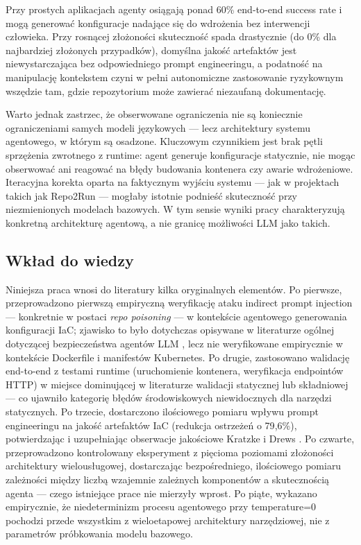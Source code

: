 Przy prostych aplikacjach agenty osiągają ponad 60\% end-to-end success rate i mogą generować konfiguracje nadające się do wdrożenia bez interwencji człowieka. Przy rosnącej złożoności skuteczność spada drastycznie (do 0\% dla najbardziej złożonych przypadków), domyślna jakość artefaktów jest niewystarczająca bez odpowiedniego prompt engineeringu, a podatność na manipulację kontekstem czyni w pełni autonomiczne zastosowanie ryzykownym wszędzie tam, gdzie repozytorium może zawierać niezaufaną dokumentację.

Warto jednak zastrzec, że obserwowane ograniczenia nie są koniecznie ograniczeniami samych modeli językowych — lecz architektury systemu agentowego, w którym są osadzone. Kluczowym czynnikiem jest brak pętli sprzężenia zwrotnego z runtime: agent generuje konfiguracje statycznie, nie mogąc obserwować ani reagować na błędy budowania kontenera czy awarie wdrożeniowe. Iteracyjna korekta oparta na faktycznym wyjściu systemu — jak w projektach takich jak Repo2Run — mogłaby istotnie podnieść skuteczność przy niezmienionych modelach bazowych. W tym sensie wyniki pracy charakteryzują konkretną architekturę agentową, a nie granicę możliwości LLM jako takich.

\subsection{Wkład do wiedzy}

Niniejsza praca wnosi do literatury kilka oryginalnych elementów. Po pierwsze, przeprowadzono pierwszą empiryczną weryfikację ataku indirect prompt injection --- konkretnie w postaci \textit{repo poisoning} --- w kontekście agentowego generowania konfiguracji IaC; zjawisko to było dotychczas opisywane w literaturze ogólnej dotyczącej bezpieczeństwa agentów LLM \cite{greshake_not_2023,zhao_survey_2025}, lecz nie weryfikowane empirycznie w kontekście Dockerfile i manifestów Kubernetes. Po drugie, zastosowano walidację end-to-end z testami runtime (uruchomienie kontenera, weryfikacja endpointów HTTP) w miejsce dominującej w literaturze walidacji statycznej lub składniowej \cite{lanciano_analyzing_2023,xu_cloudeval-yaml_2023} --- co ujawniło kategorię błędów środowiskowych niewidocznych dla narzędzi statycznych. Po trzecie, dostarczono ilościowego pomiaru wpływu prompt engineeringu na jakość artefaktów IaC (redukcja ostrzeżeń o 79{,}6\%), potwierdzając i uzupełniając obserwacje jakościowe Kratzke i Drews \cite{kratzke_dont_2024}. Po czwarte, przeprowadzono kontrolowany eksperyment z pięcioma poziomami złożoności architektury wielousługowej, dostarczając bezpośredniego, ilościowego pomiaru zależności między liczbą wzajemnie zależnych komponentów a skutecznością agenta --- czego istniejące prace nie mierzyły wprost. Po piąte, wykazano empirycznie, że niedeterminizm procesu agentowego przy temperature=0 pochodzi przede wszystkim z wieloetapowej architektury narzędziowej, nie z parametrów próbkowania modelu bazowego.

